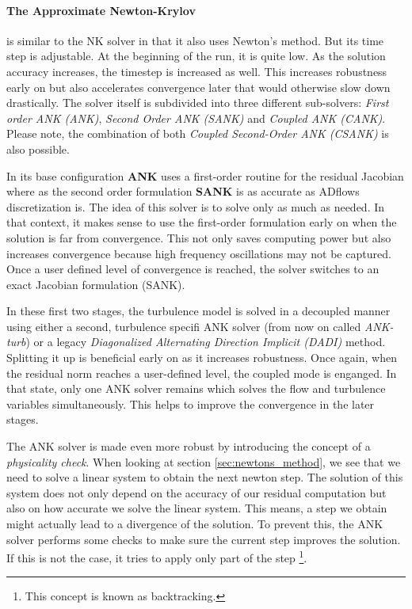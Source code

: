 \paragraph{The Approximate Newton-Krylov} is similar to the NK solver in that
it also uses Newton's method. But its time step is adjustable. At the beginning
of the run, it is quite low. As the solution accuracy increases, the timestep
is increased as well. This increases robustness early on but also accelerates
convergence later that would otherwise slow down drastically. The solver itself
is subdivided into three different sub-solvers: \textit{First order ANK (ANK)},
\textit{Second Order ANK (SANK)} and \textit{Coupled ANK (CANK)}. Please note,
the combination of both \textit{Coupled Second-Order ANK (CSANK)} is also
possible.

In its base configuration \textbf{ANK} uses a first-order routine for the
residual Jacobian where as the second order formulation \textbf{SANK} is as
accurate as ADflows discretization is. The idea of this solver is to solve only
as much as needed. In that context, it makes sense to use the first-order
formulation early on when the solution is far from convergence. This not only
saves computing power but also increases convergence because high frequency
oscillations may not be captured. Once a user defined level of convergence is
reached, the solver switches to an exact Jacobian formulation (SANK). 

In these first two stages, the turbulence model is solved in a decoupled manner
using either a second, turbulence specifi ANK solver (from now on called
\textit{ANK-turb}) or a legacy \textit{Diagonalized Alternating Direction
Implicit (DADI)} method. Splitting it up is beneficial early on as it increases
robustness. Once again, when the residual norm reaches a user-defined level,
the coupled mode is enganged. In that state, only one ANK solver remains which
solves the flow and turbulence variables simultaneously. This helps to improve
the convergence in the later stages. \cite{adflow_solvers}

The ANK solver is made even more robust by introducing the concept of a
\textit{physicality check}. When looking at section \ref{sec:newtons_method},
we see that we need to solve a linear system to obtain the next newton step.
The solution of this system does not only depend on the accuracy of our residual
computation but also on how accurate we solve the linear system. This means, a
step we obtain might actually lead to a divergence of the solution. To  prevent
this, the ANK solver performs some checks to make sure the current step
improves the solution. If this is not the case, it tries to apply only part of
the step \footnote{This concept is known as backtracking.}.




